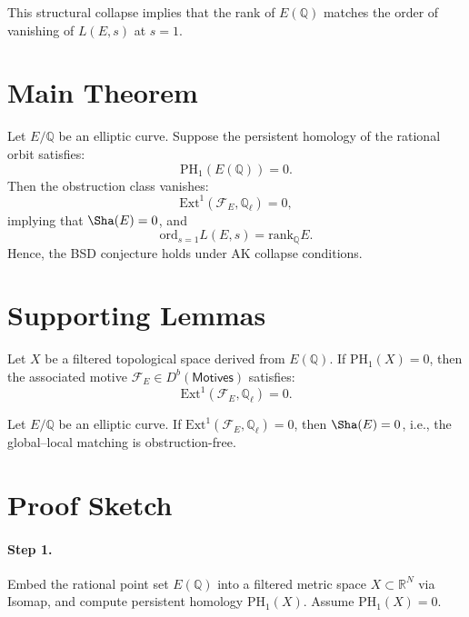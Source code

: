 This structural collapse implies that the rank of \( E(\mathbb{Q}) \) matches the order of vanishing of \( L(E,s) \) at \( s=1 \).


\section{Main Theorem}

\begin{theorem}
Let \( E/\mathbb{Q} \) be an elliptic curve.  
Suppose the persistent homology of the rational orbit satisfies:
\[
\mathrm{PH}_1(E(\mathbb{Q})) = 0.
\]
Then the obstruction class vanishes:
\[
\mathrm{Ext}^1(\mathcal{F}_E, \mathbb{Q}_\ell) = 0,
\]
implying that \( \Sha(E) = 0 \), and
\[
\mathrm{ord}_{s=1}L(E,s) = \mathrm{rank}_\mathbb{Q}E.
\]
Hence, the BSD conjecture holds under AK collapse conditions.
\end{theorem}

\section{Supporting Lemmas}

\begin{lemma}
Let \( X \) be a filtered topological space derived from \( E(\mathbb{Q}) \).  
If \( \mathrm{PH}_1(X) = 0 \), then the associated motive \( \mathcal{F}_E \in D^b(\mathsf{Motives}) \) satisfies:
\[
\mathrm{Ext}^1(\mathcal{F}_E, \mathbb{Q}_\ell) = 0.
\]
\end{lemma}

\begin{lemma}
Let \( E/\mathbb{Q} \) be an elliptic curve.  
If \( \mathrm{Ext}^1(\mathcal{F}_E, \mathbb{Q}_\ell) = 0 \), then \( \Sha(E) = 0 \), i.e., the global–local matching is obstruction-free.
\end{lemma}


\section{Proof Sketch}

\paragraph{Step 1.}
Embed the rational point set \( E(\mathbb{Q}) \) into a filtered metric space \( X \subset \mathbb{R}^N \) via Isomap, and compute persistent homology \( \mathrm{PH}_1(X) \).  
Assume \( \mathrm{PH}_1(X) = 0 \).

